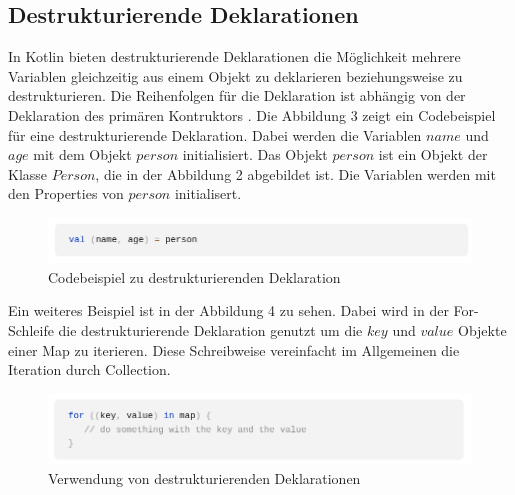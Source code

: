 \documentclass{article}
\begin{document}
\subsection{Destrukturierende Deklarationen}
In Kotlin bieten destrukturierende Deklarationen die Möglichkeit mehrere Variablen gleichzeitig aus einem Objekt zu deklarieren beziehungsweise zu destrukturieren. Die Reihenfolgen für die Deklaration ist abhängig von der Deklaration des primären Kontruktors \cite{KotlinLangDoc}. Die Abbildung 3 zeigt ein Codebeispiel für eine destrukturierende Deklaration. Dabei werden die Variablen $name$ und $age$ mit dem Objekt $person$ initialisiert. Das Objekt $person$ ist ein Objekt der Klasse $Person$, die in der Abbildung 2 abgebildet ist. Die Variablen werden mit den Properties von $person$ initialisert.
\begin{figure}[!htb]
    \centering
    \includegraphics[width=\linewidth]{img/DestrucDecl.png}
    \caption{Codebeispiel zu destrukturierenden Deklaration\footnotemark}
\end{figure}
\newline
Ein weiteres Beispiel ist in der Abbildung 4 zu sehen. Dabei wird in der For-Schleife die destrukturierende Deklaration genutzt um die $key$ und $value$ Objekte einer Map zu iterieren. Diese Schreibweise vereinfacht im Allgemeinen die Iteration durch Collection.
\begin{figure}[!htb]
    \centering
    \includegraphics[width=\linewidth]{img/DestrucDecl2.png}
    \caption{Verwendung von destrukturierenden Deklarationen \footnotemark}
\end{figure}
\end{document}
